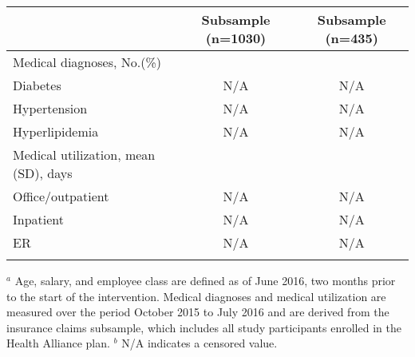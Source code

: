 \documentclass{article}
\begin{document}
\begin{table}[tbp]
\begin{tabularx}{\linewidth}{lCC}
\hspace{1em} &Subsample (n=1030)&Subsample (n=435) \tabularnewline
\midrule Medical diagnoses, No.(\%)&& \tabularnewline
\hspace{1em} Diabetes&N/A&N/A \tabularnewline
\hspace{1em} Hypertension&N/A&N/A \tabularnewline
\hspace{1em} Hyperlipidemia&N/A&N/A \tabularnewline
Medical utilization, mean (SD), days&& \tabularnewline
\hspace{1em} Office/outpatient&N/A&N/A \tabularnewline
\hspace{1em} Inpatient&N/A&N/A \tabularnewline
\hspace{1em} ER&N/A&N/A \tabularnewline
\bottomrule \addlinespace[\belowrulesep]

\end{tabularx}
\begin{flushleft}
\footnotesize $^{a}$ Age, salary, and employee class are defined as of June 2016, two months prior to the start of the intervention. Medical diagnoses and medical utilization are measured over the period October 2015 to July 2016 and are derived from the insurance claims subsample, which includes all study participants enrolled in the Health Alliance plan. \newline $^{b}$ N/A indicates a censored value.
\end{flushleft}
\end{table}
\end{document}

